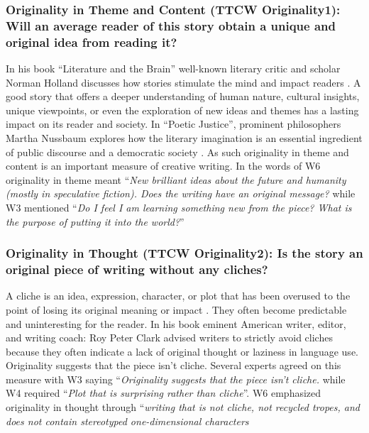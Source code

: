 \subsubsection{\textbf{{\color{blue}Originality in Theme and Content (TTCW Originality1)}: Will an average reader of this story obtain a unique and original idea from reading it?}} In his book ``Literature and the Brain'' well-known literary critic and scholar Norman Holland discusses how stories stimulate the mind and impact readers \citet{holland2009literature}. A good story that offers a deeper understanding of human nature, cultural insights, unique viewpoints, or even the exploration of new ideas and themes has a lasting impact on its reader and society. In ``Poetic Justice'', prominent philosophers Martha Nussbaum explores how the literary imagination is an essential ingredient of public discourse and a democratic society \citet{nussbaum1997poetic}. As such originality in theme and content is an important measure of creative writing. In the words of W6 originality in theme meant  ``\textit{New brilliant ideas about the future and humanity (mostly in speculative fiction). Does the writing have an original message?} while W3 mentioned ``\textit{Do I feel I am learning something new from the piece? What is the purpose of putting it into the world?}''
\subsubsection{\textbf{{\color{blue} Originality in Thought (TTCW Originality2)}: Is the story an original piece of writing without any cliches?}} A cliche is an idea, expression, character, or plot that has been overused to the point of losing its original meaning or impact \citet{fountain2012cliches}. They often become predictable and uninteresting for the reader. In his book \citet{clark2008writing} eminent American writer, editor, and writing coach: Roy Peter Clark advised writers to strictly avoid cliches because they often indicate a lack of original thought or laziness in language use. Originality suggests that the piece isn't cliche. Several experts agreed on this measure with W3 saying ``\textit{Originality suggests that the piece isn't cliche.} while W4 required ``\textit{Plot that is surprising rather than cliche}''. W6 emphasized originality in thought through ``\textit{writing that is not cliche, not recycled tropes, and does not contain stereotyped one-dimensional characters}
